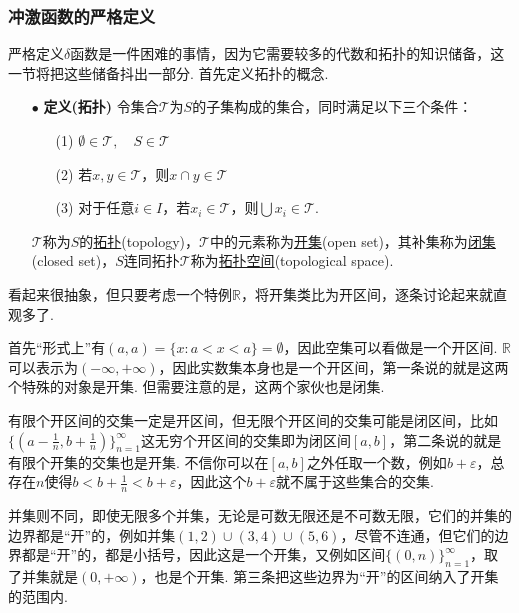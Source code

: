 \documentclass[main.tex]{subfiles}
\begin{document}
\subsubsection{冲激函数的严格定义}

严格定义\(\delta\)函数是一件困难的事情，因为它需要较多的代数和拓扑的知识储备，这一节将把这些储备抖出一部分. 首先定义拓扑的概念.

\begin{itemize}
    \item[\(\bullet\)] \textbf{定义(拓扑)}
    \newline
    令集合\(\mathcal{T}\)为\(S\)的子集构成的集合，同时满足以下三个条件：
    \begin{itemize}
        \item [(1)] \(\emptyset \in \mathcal{T}, \quad S \in \mathcal{T}\)
        \item [(2)] 若\(x,y \in \mathcal{T}\)，则\(x \cap y \in \mathcal{T}\)
        \item [(3)] 对于任意\(i \in I\)，若\(x_i \in \mathcal{T}\)，则\(\bigcup x_i \in \mathcal{T}\).
    \end{itemize}
    \(\mathcal{T}\)称为\(S\)的\uline{拓扑}(topology)，\(\mathcal{T}\)中的元素称为\uline{开集}(open set)，其补集称为\uline{闭集}(closed set)，\(S\)连同拓扑\(\mathcal{T}\)称为\uline{拓扑空间}(topological space).
\end{itemize}

看起来很抽象，但只要考虑一个特例\(\mathbb{R}\)，将开集类比为开区间，逐条讨论起来就直观多了. 

首先“形式上”有\((a,a)=\{x: a<x<a\}=\emptyset\)，因此空集可以看做是一个开区间. \(\mathbb{R}\)可以表示为\((-\infty,+\infty)\)，因此实数集本身也是一个开区间，第一条说的就是这两个特殊的对象是开集. 但需要注意的是，这两个家伙也是闭集.

有限个开区间的交集一定是开区间，但无限个开区间的交集可能是闭区间，比如\(\{(a-\frac{1}{n}, b+\frac{1}{n})\}_{n=1}^{\infty}\)这无穷个开区间的交集即为闭区间\([a,b]\)，第二条说的就是有限个开集的交集也是开集. 不信你可以在\([a,b]\)之外任取一个数，例如\(b+\varepsilon\)，总存在\(n\)使得\(b<b+\frac{1}{n}<b+\varepsilon\)，因此这个\(b+\varepsilon\)就不属于这些集合的交集.

并集则不同，即使无限多个并集，无论是可数无限还是不可数无限，它们的并集的边界都是“开”的，例如并集\((1,2)\cup(3,4)\cup(5,6)\)，尽管不连通，但它们的边界都是“开”的，都是小括号，因此这是一个开集，又例如区间\(\{(0,n)\}_{n=1}^{\infty}\)，取了并集就是\((0,+\infty)\)，也是个开集. 第三条把这些边界为“开”的区间纳入了开集的范围内.
\end{document}
